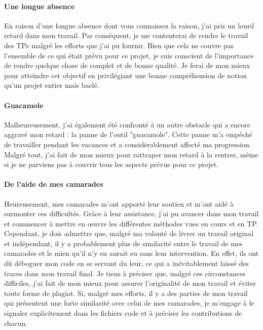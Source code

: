 \documentclass[10pt,a4paper]{article}
\begin{document}
	\paragraph{Une longue absence} %
		En raison d'une longue absence dont vous connaissez la raison, j'ai pris un lourd retard dans mon travail. Par conséquent, je me contenterai de rendre le travail des TPs malgré les efforts que j'ai pu fournir. Bien que cela ne couvre pas l'ensemble de ce qui était prévu pour ce projet, je suis conscient de l'importance de rendre quelque chose de complet et de bonne qualité. Je ferai de mon mieux pour atteindre cet objectif en privilégiant une bonne compréhension de notion qu'un projet entier mais baclé.

	\paragraph{Guacamole}
		Malheureusement, j'ai également été confronté à un autre obstacle qui a encore aggravé mon retard : la panne de l'outil "guacamole". Cette panne m'a empêché de travailler pendant les vacances et a considérablement affecté ma progression. Malgré tout, j'ai fait de mon mieux pour rattraper mon retard à la rentrer, même si je ne parviens pas à couvrir tous les aspects prévus pour ce projet.

	\paragraph{De l'aide de mes camarades}
		Heureusement, mes camarades m'ont apporté leur soutien et m'ont aidé à surmonter ces difficultés. Grâce à leur assistance, j'ai pu avancer dans mon travail et commencer à mettre en œuvre les différentes méthodes vues en cours et en TP. Cependant, je dois admettre que, malgré ma volonté de livrer un travail original et indépendant, il y a probablement plus de similarité entre le travail de mes camarades et le mien qu'il n'y en aurait eu sans leur intervention. En effet, ils ont dû déboguer mon code en se servant du leur, ce qui a inévitablement laissé des traces dans mon travail final. Je tiens à préciser que, malgré ces circonstances difficiles, j'ai fait de mon mieux pour assurer l'originalité de mon travail et éviter toute forme de plagiat. Si, malgré mes efforts, il y a des parties de mon travail qui présentent une forte similarité avec celui de mes camarades, je m'engage à le signaler explicitement dans les fichiers code et à préciser les contributions de chacun.
	
\end{document}
